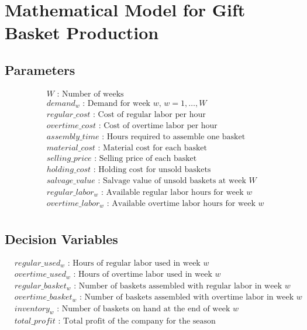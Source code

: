 \documentclass{article}
\begin{document}
\section*{Mathematical Model for Gift Basket Production}

\subsection*{Parameters}
\begin{align*}
& W \text{ : Number of weeks} \\
& demand_{w} \text{ : Demand for week } w, \, w = 1, \ldots, W \\
& regular\_cost \text{ : Cost of regular labor per hour} \\
& overtime\_cost \text{ : Cost of overtime labor per hour} \\
& assembly\_time \text{ : Hours required to assemble one basket} \\
& material\_cost \text{ : Material cost for each basket} \\
& selling\_price \text{ : Selling price of each basket} \\
& holding\_cost \text{ : Holding cost for unsold baskets} \\
& salvage\_value \text{ : Salvage value of unsold baskets at week } W \\
& regular\_labor_{w} \text{ : Available regular labor hours for week } w \\
& overtime\_labor_{w} \text{ : Available overtime labor hours for week } w \\
\end{align*}

\subsection*{Decision Variables}
\begin{align*}
& regular\_used_{w} \text{ : Hours of regular labor used in week } w \\
& overtime\_used_{w} \text{ : Hours of overtime labor used in week } w \\
& regular\_basket_{w} \text{ : Number of baskets assembled with regular labor in week } w \\
& overtime\_basket_{w} \text{ : Number of baskets assembled with overtime labor in week } w \\
& inventory_{w} \text{ : Number of baskets on hand at the end of week } w \\
& total\_profit \text{ : Total profit of the company for the season} \\
\end{align*}
\end{document}
